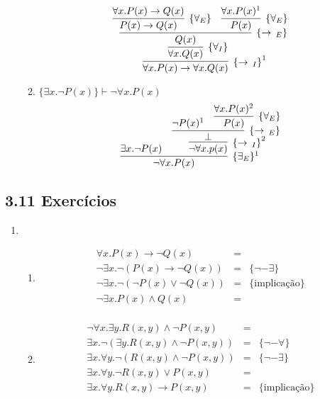 \begin{enumerate}
\begin{enumerate}
				\[
				\infer[\impI^1]
					{\forall x. P(x) \to \forall x. Q(x)}
					{
						\infer[\{\forall_I\}]
							{\forall x . Q(x)}
							{
								\infer[\impE]
									{Q(x)}
									{
										\infer[\{\forall_E\}]
											{P(x) \to Q(x)}
											{\forall x. P(x) \to Q(x)}
										&
										\infer[\{\forall_E\}]
											{P(x)}
											{\forall x. P(x)^1}
									}
							}
					}
				\]
			\item $\{\exists x. \neg P(x)\} \vdash \neg \forall x. P(x)$
				\[
					\infer[\{\exists_E\}^1]
						{\neg \forall x. P(x)}
						{
							\exists x. \neg P(x)
							&
							\infer[\impI^2]
								{\neg \forall x. p(x)}
								{
									\infer[\impE]
										{\bot}
										{
											\neg P(x)^1
											&
											\infer[\{\forall_E\}]
												{P(x)}
												{\forall x. P(x)^2}
										}
								}
						}
				\]
		\end{enumerate}
	\end{enumerate}
	
\subsection{3.11 Exerc\'icios}
	
		\begin{enumerate}
			\item 
			\begin{enumerate}
				\item
				\[
				   \begin{array}{lcl}
				   	  \forall x. P(x) \to \neg Q(x) & = & \\
				   	  \neg \exists x. \neg(P(x) \to \neg Q(x)) & = & \{\neg-\exists\} \\
				   	  \neg \exists x. \neg(\neg P(x) \lor \neg Q(x)) & = & \{\text{implica\c{c}\~ao}\} \\
				   	  \neg \exists x. P(x) \land Q(x) & = & \\
				   \end{array}
				\]
				\item
				\[
				   \begin{array}{lcl}
				   	  \neg \forall x.\exists y.R(x, y) \land \neg P(x, y) & = & \\
				   	  \exists x. \neg(\exists y. R(x, y) \land \neg P(x, y)) & = & \{\neg-\forall\} \\
				   	  \exists x. \forall y.\neg(R (x, y) \land \neg P(x, y)) & = & \{\neg-\exists\}\\
				   	  \exists x. \forall y. \neg R(x, y) \lor P (x, y) & = & \\
				   	  \exists x. \forall y. R(x, y) \to P(x, y) & = & \{\text{implica\c{c}\~ao}\} \\
				   \end{array}
				\]
			\end{enumerate}
		\end{enumerate}
	